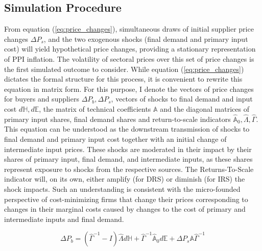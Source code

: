 \subsection{Simulation Procedure}

From equation (\ref{eq:price_changes}), simultaneous draws of initial supplier price changes $\Delta P_s$, and the two exogenous shocks 
(final demand and primary input cost) will yield hypothetical price changes, providing a stationary representation of PPI inflation. The 
volatility of sectoral prices over this set of price changes is the first simulated outcome to consider. While equation 
(\ref{eq:price_changes}) dictates the formal structure for this process, it is convenient to rewrite this equation in matrix form. For 
this purpose, I denote the vectors of price changes for buyers and suppliers $\Delta P_{b}, \Delta P_{s}$, vectors of shocks to final 
demand and input cost $d \mathbb{H}, d \mathbb{E}$, the matrix of technical coefficients $\mathbb{A}$ and the diagonal matrices of 
primary input shares, final demand shares and return-to-scale indicators $\hat{\mathbb{A}}_0, \hat{\Lambda}, \hat{\Gamma}$. This 
equation can be understood as the downstream transmission of shocks to final demand and primary input cost together with an initial 
change of intermediate input prices. These shocks are moderated in their impact by their shares of primary input, final demand, and 
intermediate inputs, as these shares represent exposure to shocks from the respective sources. The Returns-To-Scale indicator will, on 
its own, either amplify (for DRS) or diminish (for IRS) the shock impacts. Such an understanding is consistent with the micro-founded 
perspective of cost-minimizing firms that change their prices corresponding to changes in their marginal costs caused by changes to the 
cost of primary and intermediate inputs and final demand.

\begin{equation} \label{eq:downstream_changes}
    \Delta P_{b} = (\hat{\Gamma}^{-1} - I) \hat{\Lambda} d \mathbb{H} + \hat{\Gamma}^{-1} \hat{\mathbb{A}}_0 d \mathbb{E} + \Delta P_{s} \mathbb{A} \hat{\Gamma}^{-1}
\end{equation}

